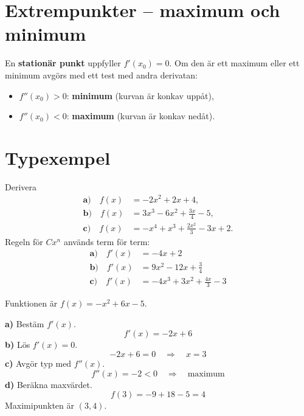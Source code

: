 \section{Extrempunkter -- maximum och minimum}
\label{c12:sec:extrempunkter}
En \textbf{stationär punkt} uppfyller $f'(x_0) = 0$. Om den är ett maximum eller ett minimum
avgörs med ett test med andra derivatan:
\begin{itemize}
  \item $f''(x_0) > 0$: \textbf{minimum} (kurvan är konkav uppåt),
  \item $f''(x_0) < 0$: \textbf{maximum} (kurvan är konkav nedåt).
\end{itemize}

\section{Typexempel}
\label{c12:sec:typexempel}

\begin{exempel}
Derivera
\begin{align*}
  \textbf{a)}\quad f(x) &= -2x^2 + 2x + 4, \\
  \textbf{b)}\quad f(x) &= 3x^3 - 6x^2 + \frac{3x}{4} - 5, \\
  \textbf{c)}\quad f(x) &= -x^4 + x^3 + \frac{2x^2}{3} - 3x + 2.
\end{align*}
Regeln för $Cx^n$ används term för term:
\begin{align*}
  \textbf{a)}\quad f'(x) &= -4x + 2 \\
  \textbf{b)}\quad f'(x) &= 9x^2 - 12x + \frac{3}{4} \\
  \textbf{c)}\quad f'(x) &= -4x^3 + 3x^2 + \frac{4x}{3} - 3
\end{align*}
\end{exempel}

\begin{exempel}
Funktionen är $f(x) = -x^2 + 6x - 5$.
\par\noindent\textbf{a)} Bestäm $f'(x)$.
\[
  f'(x) = -2x + 6
\]
\textbf{b)} Lös $f'(x) = 0$.
\[
  -2x + 6 = 0 \quad \Rightarrow \quad x = 3
\]
\textbf{c)} Avgör typ med $f''(x)$.
\[
  f''(x) = -2 < 0 \quad \Rightarrow \quad \text{maximum}
\]
\textbf{d)} Beräkna maxvärdet.
\[
  f(3) = -9 + 18 - 5 = 4
\]
Maximipunkten är $(3, 4)$.
\end{exempel}

